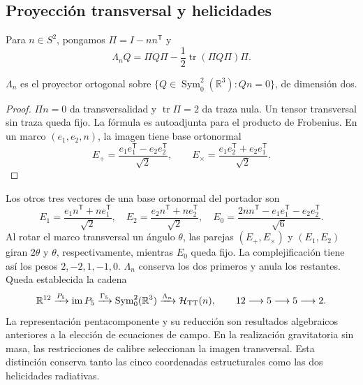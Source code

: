 \subsection{Proyección transversal y helicidades}
Para \(n\in S^2\), pongamos \(\Pi=I-nn^{\mathsf T}\) y
\[
 \Lambda_nQ=\Pi Q\Pi-\frac12\operatorname{tr}(\Pi Q\Pi)\Pi.
\]
\begin{proposition}
\(\Lambda_n\) es el proyector ortogonal sobre
\(\{Q\in\operatorname{Sym}^2_0(\mathbb R^3):Qn=0\}\), de dimensión dos.
\end{proposition}
\begin{proof}
\(\Pi n=0\) da transversalidad y \(\operatorname{tr}\Pi=2\) da
traza nula. Un tensor transversal sin traza queda fijo.
La fórmula es autoadjunta para el producto de Frobenius.
En un marco \((e_1,e_2,n)\), la imagen tiene base ortonormal
\[
 E_+=\frac{e_1e_1^{\mathsf T}-e_2e_2^{\mathsf T}}{\sqrt2},\qquad
 E_\times=\frac{e_1e_2^{\mathsf T}+e_2e_1^{\mathsf T}}{\sqrt2}.
\]
\end{proof}
Los otros tres vectores de una base ortonormal del portador son
\[
 E_1=\frac{e_1n^{\mathsf T}+ne_1^{\mathsf T}}{\sqrt2},\quad
 E_2=\frac{e_2n^{\mathsf T}+ne_2^{\mathsf T}}{\sqrt2},\quad
 E_0=\frac{2nn^{\mathsf T}-e_1e_1^{\mathsf T}-e_2e_2^{\mathsf T}}{\sqrt6}.
\]
Al rotar el marco transversal un ángulo \(\theta\), las parejas
\((E_+,E_\times)\) y \((E_1,E_2)\) giran \(2\theta\) y
\(\theta\), respectivamente, mientras \(E_0\) queda fijo. La
complejificación tiene así los pesos \(2,-2,1,-1,0\).
\(\Lambda_n\) conserva los dos primeros y anula los restantes.
Queda establecida la cadena
\[
 \mathbb R^{12}\xrightarrow{P_5}\operatorname{im}P_5
 \xrightarrow{\Gamma_5}\operatorname{Sym}^2_0(\mathbb R^3)
 \xrightarrow{\Lambda_n}\mathcal H_{\rm TT}(n),
 \qquad 12\longrightarrow5\longrightarrow5\longrightarrow2.
\]
La representación pentacomponente y su reducción son resultados
algebraicos anteriores a la elección de ecuaciones de campo.
En la realización gravitatoria sin masa, las restricciones de calibre
seleccionan la imagen transversal. Esta distinción conserva tanto las
cinco coordenadas estructurales como las dos helicidades radiativas.

